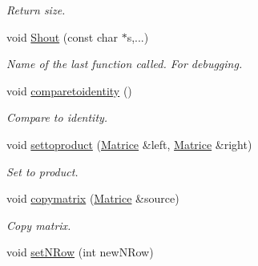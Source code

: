 \begin{DoxyCompactItemize}
\begin{DoxyCompactList}\small\item\em \-Return size. \end{DoxyCompactList}\item 
\hypertarget{classMatrice_ac11429f7ec42e6eb4806e77f8aa24e7f}{void \hyperlink{classMatrice_ac11429f7ec42e6eb4806e77f8aa24e7f}{\-Shout} (const char $\ast$s,...)}\label{classMatrice_ac11429f7ec42e6eb4806e77f8aa24e7f}

\begin{DoxyCompactList}\small\item\em \-Name of the last function called. \-For debugging. \end{DoxyCompactList}\item 
\hypertarget{classMatrice_a15f367c26198d2a68e87dd0881771a47}{void \hyperlink{classMatrice_a15f367c26198d2a68e87dd0881771a47}{comparetoidentity} ()}\label{classMatrice_a15f367c26198d2a68e87dd0881771a47}

\begin{DoxyCompactList}\small\item\em \-Compare to identity. \end{DoxyCompactList}\item 
\hypertarget{classMatrice_a71879f4bca600c787f6509d381a18898}{void \hyperlink{classMatrice_a71879f4bca600c787f6509d381a18898}{settoproduct} (\hyperlink{classMatrice}{\-Matrice} \&left, \hyperlink{classMatrice}{\-Matrice} \&right)}\label{classMatrice_a71879f4bca600c787f6509d381a18898}

\begin{DoxyCompactList}\small\item\em \-Set to product. \end{DoxyCompactList}\item 
\hypertarget{classMatrice_acf5a1b0b528030fe0eee6182757c05de}{void \hyperlink{classMatrice_acf5a1b0b528030fe0eee6182757c05de}{copymatrix} (\hyperlink{classMatrice}{\-Matrice} \&source)}\label{classMatrice_acf5a1b0b528030fe0eee6182757c05de}

\begin{DoxyCompactList}\small\item\em \-Copy matrix. \end{DoxyCompactList}\item 
\hypertarget{classMatrice_a26e611b77062b246d913c6038ea86189}{void \hyperlink{classMatrice_a26e611b77062b246d913c6038ea86189}{set\-N\-Row} (int new\-N\-Row)}\label{classMatrice_a26e611b77062b246d913c6038ea86189}


\end{DoxyCompactItemize}
